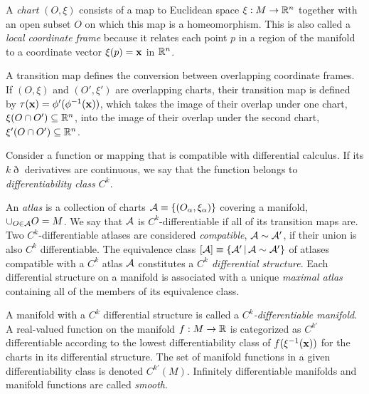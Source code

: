 \documentclass[11pt]{article}
\numberwithin{equation}{section}
\begin{document}
\begin{dfn}
A \textit{chart} $(O, \xi)$ consists of a map to Euclidean space $\xi:M\rightarrow\mb{R}^n$ together with an open subset $O$ on which this map is a homeomorphism.
This is also called a \textit{local coordinate frame} because it relates each point $p$ in a region of the manifold to a coordinate vector $\xi(p)=\bo{x}$ in $\mathbb{R}^n$.
\end{dfn}

\begin{dfn}
A transition map defines the conversion between overlapping coordinate frames.
If $(O, \xi)$ and $(O', \xi')$ are overlapping charts, their transition map is defined by $\tau (\mathbf{x})=\phi '(\phi ^{-1}(\mathbf{x}))$, which takes the image of their overlap under one chart, $\xi(O\cap O')\subseteq \mb{R}^n$, into the image of their overlap under the second chart, $\xi'(O\cap O')\subseteq \mb{R}^n$.
\end{dfn}

\begin{dfn}
Consider a function or mapping that is compatible with differential calculus.
If its $k\eth$ derivatives are continuous, we say that the function belongs to \textit{differentiability class $C^k$}.
\end{dfn}


\begin{dfn}
An \textit{atlas} is a collection of charts $\mc{A}\equiv\{(O_\a, \xi_\a)\}$ covering a manifold,
$
  \cup_{O\in\mathcal{A}}
  O
=
  M
$.
We say that $\mathcal{A}$ is $C^k$-differentiable if all of its transition maps are.
Two $C^k$-differentiable atlases are considered \textit{compatible}, $\mathcal{A}\sim\mathcal{A}'$, if their union is also $C^k$ differentiable.
The equivalence class $[\mathcal{A}]\equiv\{\mathcal{A}'\,|\,\mathcal{A}\sim\mathcal{A}'\}$ of atlases compatible with a $C^k$ atlas $\mathcal{A}$ constitutes a \textit{$C^k$ differential structure}.
Each differential structure on a manifold is associated with a unique \textit{maximal atlas} containing all of the members of its equivalence class.
\end{dfn}

\begin{samepage}
\begin{dfn}
A manifold with a $C^k$ differential structure is called a \textit{$C^k$-differentiable manifold}.
A real-valued function on the manifold $f:M\rightarrow\mathbb{R}$ is categorized as $C^{k'}$ differentiable according to the lowest differentiability class of $f(\xi^{-1}(\bo{x}))$ for the charts in its differential structure.
The set of manifold functions in a given differentiability class is denoted $C^{k'}(M)$.
Infinitely differentiable manifolds and manifold functions are called \textit{smooth}.
\end{dfn}
\end{samepage}
\end{document}
